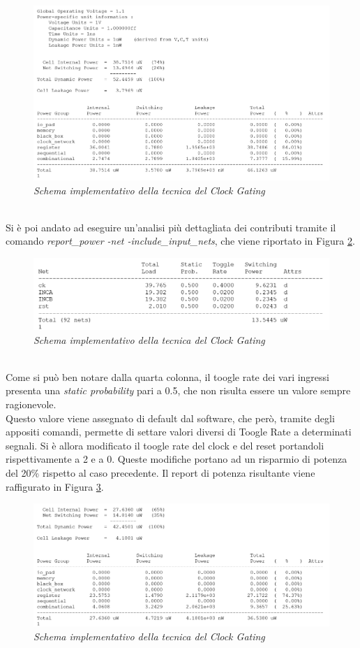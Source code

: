 \begin{figure}[!htb]
	\centering
	\includegraphics[scale=0.8]{immagini/3_1}
	\caption{\textit{Schema implementativo della tecnica del Clock Gating}}
	\label{3_1}
\end{figure}
\\
Si è poi andato ad eseguire un'analisi più dettagliata dei contributi tramite il comando \textit{report\_power -net -include\_input\_nets}, che viene riportato in Figura \ref{3_2}. \\
\begin{figure}[!htb]
	\centering
	\includegraphics[scale=0.8]{immagini/3_2}
	\caption{\textit{Schema implementativo della tecnica del Clock Gating}}
	\label{3_2}
\end{figure}
\\
Come si può ben notare dalla quarta colonna, il toogle rate dei vari ingressi presenta una \textit{static probability} pari a 0.5, che non risulta essere un valore sempre ragionevole. \\
Questo valore viene assegnato di default dal software, che però, tramite degli appositi comandi, permette di settare valori diversi di Toogle Rate a determinati segnali. Si è allora modificato il toogle rate del clock e del reset portandoli rispettivamente a 2 e a 0. Queste modifiche portano ad un risparmio di potenza del 20\% rispetto al caso precedente. Il report di potenza risultante viene raffigurato in Figura \ref{3_3}.
\begin{figure}[!htb]
	\centering
	\includegraphics[scale=0.8]{immagini/3_3}
	\caption{\textit{Schema implementativo della tecnica del Clock Gating}}
	\label{3_3}
\end{figure}
